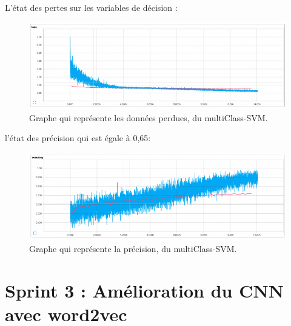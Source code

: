  L’état des pertes sur les variables de décision :

\begin{figure}[H]
	\begin{center}
	\includegraphics[width=\linewidth]{Images/cnn4.png}
	\end{center}
	\caption{Graphe qui représente les données perdues, du multiClass-SVM.}
	\label{fig:rnn}
\end{figure}
 l'état des précision qui est égale à 0,65:
\begin{figure}[H]
	\begin{center}
	\includegraphics[width=\linewidth]{Images/cnn5.png}
	\end{center}
	\caption{Graphe qui représente la précision, du  multiClass-SVM.}
	\label{fig:rnn}
\end{figure}







\chapter{Sprint 3 : Amélioration du CNN avec word2vec}
\label{Chapitre 6} %



